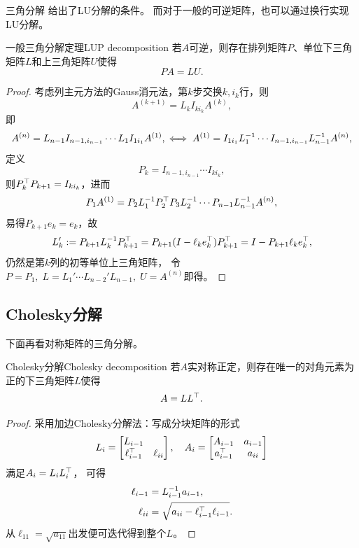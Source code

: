 三角分解 给出了LU分解的条件。
而对于一般的可逆矩阵，也可以通过换行实现LU分解。

\begin{theorem}
    {一般三角分解定理}{LUP decomposition}
    若$A$可逆，则存在排列矩阵$P$、单位下三角矩阵$L$和上三角矩阵$U$使得
    \begin{equation}
        PA = LU.
    \end{equation}
\end{theorem}

\begin{proof}
    考虑列主元方法的Gauss消元法，第$k$步交换$k,i_k$行，则
    \[
        A^{(k+1)} = L_kI_{ki_k}A^{(k)},
    \]
    即
    \[
        A^{(n)} = L_{n-1}I_{n-1,i_{n-1}}\cdots L_1I_{1i_1}A^{(1)},
        \iff
        A^{(1)} = I_{1i_1}L_1^{-1}\cdots I_{n-1,i_{n-1}}L_{n-1}^{-1} A^{(n)},
    \]
    定义
    \[
        P_k = I_{n-1,i_{n-1}}\cdots I_{ki_k},
    \]
    则$P_k^\top P_{k+1} = I_{ki_k}$，进而
    \[
        P_1A^{(1)} = P_2L_1^{-1} P_2^\top P_3L_2^{-1}\cdots P_{n-1}L_{n-1}^{-1} A^{(n)},
    \]
    易得$P_{k+1}e_k = e_k$，故
    \[
        L_k' := P_{k+1}L_k^{-1} P_{k+1}^\top = P_{k+1}(I - \ell_ke_k^\top)P_{k+1}^\top = I - P_{k+1}\ell_ke_k^\top,
    \]
    仍然是第$k$列的初等单位上三角矩阵，
    令$P = P_1,\;L = L_1'\cdots L_{n-2}'L_{n-1},\;U = A^{(n)}$即得。
\end{proof}

\subsection{Cholesky分解}

下面再看对称矩阵的三角分解。

\begin{theorem}
    {Cholesky分解}{Cholesky decomposition}
    若$A$实对称正定，则存在唯一的对角元素为正的下三角矩阵$L$使得
    \begin{equation}
        A = LL^\top.
    \end{equation}
\end{theorem}

\begin{proof}
    采用加边Cholesky分解法：写成分块矩阵的形式
    \[
        L_i = \begin{bmatrix}
            L_{i-1}\\\ell_{i-1}^\top&\ell_{ii}
        \end{bmatrix},\quad A_i = \begin{bmatrix}
            A_{i-1}&a_{i-1}\\ a_{i-1}^\top&a_{ii}
        \end{bmatrix}
    \]
    满足$A_i = L_iL_i^\top$，
    可得 
    \begin{subequations}
        \begin{align}
            \ell_{i-1} &= L_{i-1}^{-1} a_{i-1},\\
            \ell_{ii} &= \sqrt{a_{ii} - \ell_{i-1}^\top\ell_{i-1}}.
        \end{align}
    \end{subequations}
    从$\ell_{11} = \sqrt{a_{11}}$出发便可迭代得到整个$L$。
\end{proof}

